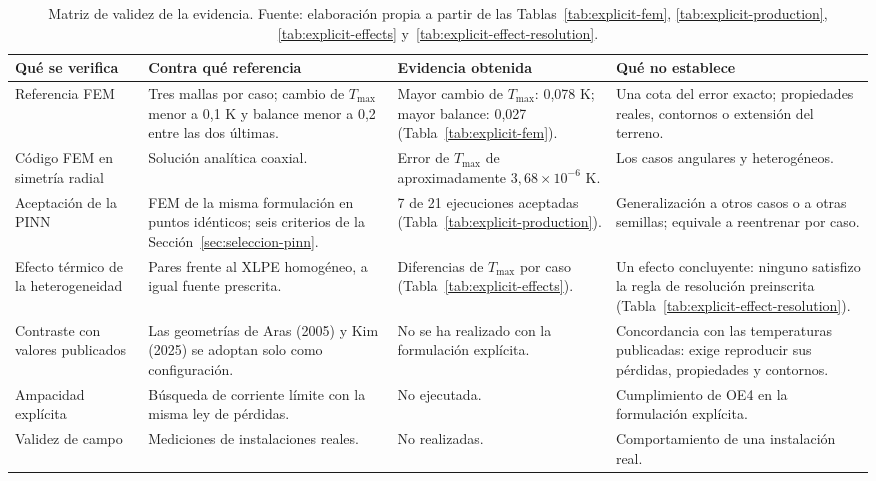 \begin{table}[htbp]
\centering
\caption{Matriz de validez de la evidencia. Fuente: elaboración propia a partir de las Tablas~\ref{tab:explicit-fem}, \ref{tab:explicit-production}, \ref{tab:explicit-effects} y~\ref{tab:explicit-effect-resolution}.}
\label{tab:matriz-validez}
\setlength{\tabcolsep}{3pt}
\begin{tabularx}{\textwidth}{L{2.7cm}Y Y Y}
\toprule
Qué se verifica & Contra qué referencia & Evidencia obtenida & Qué no establece \\
\midrule
Referencia FEM & Tres mallas por caso; cambio de $T_{\max}$ menor a 0,1 K y balance menor a 0,2\,\pct{} entre las dos últimas. & Mayor cambio de $T_{\max}$: 0,078 K; mayor balance: 0,027\,\pct{} (Tabla~\ref{tab:explicit-fem}). & Una cota del error exacto; propiedades reales, contornos o extensión del terreno. \\
Código FEM en simetría radial & Solución analítica coaxial. & Error de $T_{\max}$ de aproximadamente $3{,}68\times10^{-6}$ K. & Los casos angulares y heterogéneos. \\
Aceptación de la PINN & FEM de la misma formulación en puntos idénticos; seis criterios de la Sección~\ref{sec:seleccion-pinn}. & 7 de 21 ejecuciones aceptadas (Tabla~\ref{tab:explicit-production}). & Generalización a otros casos o a otras semillas; equivale a reentrenar por caso. \\
Efecto térmico de la heterogeneidad & Pares frente al XLPE homogéneo, a igual fuente prescrita. & Diferencias de $T_{\max}$ por caso (Tabla~\ref{tab:explicit-effects}). & Un efecto concluyente: ninguno satisfizo la regla de resolución preinscrita (Tabla~\ref{tab:explicit-effect-resolution}). \\
Contraste con valores publicados & Las geometrías de Aras (2005) y Kim (2025) se adoptan solo como configuración. & No se ha realizado con la formulación explícita. & Concordancia con las temperaturas publicadas: exige reproducir sus pérdidas, propiedades y contornos. \\
Ampacidad explícita & Búsqueda de corriente límite con la misma ley de pérdidas. & No ejecutada. & Cumplimiento de OE4 en la formulación explícita. \\
Validez de campo & Mediciones de instalaciones reales. & No realizadas. & Comportamiento de una instalación real. \\
\bottomrule
\end{tabularx}
\end{table}

